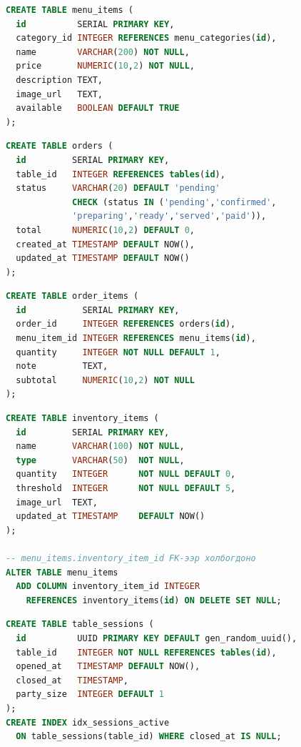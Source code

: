 \begin{lstlisting}[language=SQL, caption={menu\_items хүснэгтийн бүтэц}, label={lst:items}]
CREATE TABLE menu_items (
  id          SERIAL PRIMARY KEY,
  category_id INTEGER REFERENCES menu_categories(id),
  name        VARCHAR(200) NOT NULL,
  price       NUMERIC(10,2) NOT NULL,
  description TEXT,
  image_url   TEXT,
  available   BOOLEAN DEFAULT TRUE
);
\end{lstlisting}

\begin{lstlisting}[language=SQL, caption={orders хүснэгтийн бүтэц}, label={lst:orders}]
CREATE TABLE orders (
  id         SERIAL PRIMARY KEY,
  table_id   INTEGER REFERENCES tables(id),
  status     VARCHAR(20) DEFAULT 'pending'
             CHECK (status IN ('pending','confirmed',
             'preparing','ready','served','paid')),
  total      NUMERIC(10,2) DEFAULT 0,
  created_at TIMESTAMP DEFAULT NOW(),
  updated_at TIMESTAMP DEFAULT NOW()
);
\end{lstlisting}

\begin{lstlisting}[language=SQL, caption={order\_items хүснэгтийн бүтэц}, label={lst:oitems}]
CREATE TABLE order_items (
  id           SERIAL PRIMARY KEY,
  order_id     INTEGER REFERENCES orders(id),
  menu_item_id INTEGER REFERENCES menu_items(id),
  quantity     INTEGER NOT NULL DEFAULT 1,
  note         TEXT,
  subtotal     NUMERIC(10,2) NOT NULL
);
\end{lstlisting}

\begin{lstlisting}[language=SQL, caption={inventory\_items хүснэгтийн бүтэц}, label={lst:inv}]
CREATE TABLE inventory_items (
  id         SERIAL PRIMARY KEY,
  name       VARCHAR(100) NOT NULL,
  type       VARCHAR(50)  NOT NULL,
  quantity   INTEGER      NOT NULL DEFAULT 0,
  threshold  INTEGER      NOT NULL DEFAULT 5,
  image_url  TEXT,
  updated_at TIMESTAMP    DEFAULT NOW()
);

-- menu_items.inventory_item_id FK-ээр холбогдоно
ALTER TABLE menu_items
  ADD COLUMN inventory_item_id INTEGER
    REFERENCES inventory_items(id) ON DELETE SET NULL;
\end{lstlisting}

\begin{lstlisting}[language=SQL, caption={table\_sessions хүснэгтийн бүтэц}, label={lst:sessions}]
CREATE TABLE table_sessions (
  id          UUID PRIMARY KEY DEFAULT gen_random_uuid(),
  table_id    INTEGER NOT NULL REFERENCES tables(id),
  opened_at   TIMESTAMP DEFAULT NOW(),
  closed_at   TIMESTAMP,
  party_size  INTEGER DEFAULT 1
);
CREATE INDEX idx_sessions_active
  ON table_sessions(table_id) WHERE closed_at IS NULL;
\end{lstlisting}

